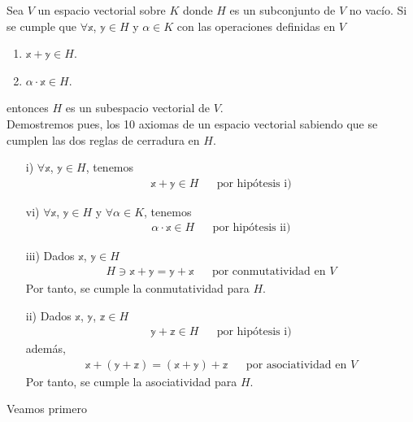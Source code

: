 \begin{theorem}\label{theorem:JAJSUJGBUHBOSOIOOSK}
    Sea $V$ un espacio vectorial sobre $K$ donde $H$ es un subconjunto de $V$ no vacío. Si se cumple que $\forall \mathbb{x}$, $\mathbb{y} \in H$ y $\alpha \in K$ con las operaciones definidas en $V$
    \begin{enumerate}[label=\roman*)]
        \item $\mathbb{x} + \mathbb{y} \in H$.
        \item $\alpha \cdot \mathbb{x} \in H$.
    \end{enumerate}
    entonces $H$ es un subespacio vectorial de $V$. \\
    \demostracion Demostremos pues, los 10 axiomas de un espacio vectorial sabiendo que se cumplen las dos reglas de cerradura en $H$.
    \begin{enumerate}
        \item[i)] $\forall \mathbb{x}$, $\mathbb{y} \in H$, tenemos
        \begin{align*}
            \mathbb{x} + \mathbb{y} \in H && \text{por hipótesis i)}
        \end{align*}
        \item[vi)] $\forall \mathbb{x}$, $\mathbb{y} \in H$ y $\forall \alpha \in K$, tenemos
        \begin{align*}
            \alpha \cdot \mathbb{x} \in H && \text{por hipótesis ii)}
        \end{align*}
        \item[iii)] Dados $\mathbb{x}$, $\mathbb{y} \in H$
        \begin{align*}
            H \ni \mathbb{x} + \mathbb{y} = \mathbb{y} + \mathbb{x} && \text{por  conmutatividad en $V$}
        \end{align*}
        Por tanto, se cumple la conmutatividad para $H$.
        \item[ii)] Dados $\mathbb{x}$, $\mathbb{y}$, $\mathbb{z} \in H$
        \begin{align*}
            \mathbb{y} + \mathbb{z} \in H && \text{por hipótesis i)}
        \end{align*}
        además,
        \begin{align*}
            \mathbb{x} + (\mathbb{y} + \mathbb{z})  = (\mathbb{x} + \mathbb{y}) + \mathbb{z} && \text{por asociatividad en $V$}
        \end{align*}
        Por tanto, se cumple la asociatividad para $H$.
    \end{enumerate}
    Veamos primero

\end{theorem}
